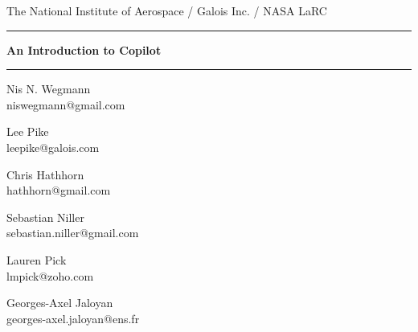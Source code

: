 \documentclass[12pt]{article}
\theoremstyle{example}
\newcommand{\HRule}{\rule{\linewidth}{0.25pt}}
\begin{document}
\thispagestyle{empty}

\begin{center}

The National Institute of Aerospace / Galois Inc. / NASA LaRC

\vspace{0.1cm}

\HRule

\vspace{0.6cm}

{\Huge \bfseries
An Introduction to Copilot
}
\HRule

\vspace{0.6cm}

\begin{minipage}{0.4\textwidth}
\large
\begin{center}
Nis N. Wegmann\\
\small{
niswegmann@gmail.com\\
}

\end{center}
\end{minipage}
\begin{minipage}{0.4\textwidth}
\large
\begin{center}
Lee Pike\\
\small{
leepike@galois.com\\
}
\end{center}
\end{minipage}
\vspace{1cm}



\begin{minipage}{0.3\textwidth}
\large
\begin{center}
Chris Hathhorn \\
\small{
hathhorn@gmail.com\\
}
\end{center}
\end{minipage}
\begin{minipage}{0.3\textwidth}
\large
\begin{center}
Sebastian Niller\\
\small{
sebastian.niller@gmail.com\\
}
\end{center}
\end{minipage}

\vspace{1cm}

\begin{minipage}{0.3\textwidth}
\large
\begin{center}
Lauren Pick\\
\small{
lmpick@zoho.com\\
}
\end{center}
\end{minipage}
\begin{minipage}{0.3\textwidth}
\large
\begin{center}
Georges-Axel Jaloyan \\
\small{
georges-axel.jaloyan@ens.fr\\
}
\end{center}
\end{minipage}


\end{center}
\end{document}
